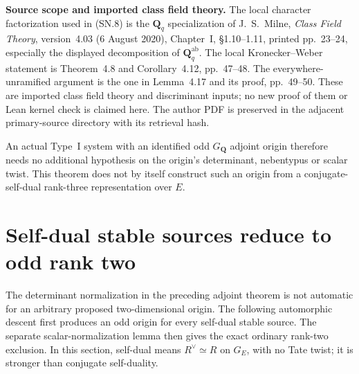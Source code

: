 \documentclass[11pt,a4paper]{article}
\theoremstyle{definition}
\renewcommand{\paragraph}[1]{\par\smallskip\noindent\textbf{#1}\quad\ignorespaces}
\begin{document}
\paragraph{Source scope and imported class field theory.}
The local character factorization used in (SN.8) is the
$\mathbf Q_q$ specialization of J.~S.~Milne,
\emph{Class Field Theory}, version~4.03 (6 August 2020),
Chapter~I, \S1.10--1.11, printed pp.~23--24, especially
the displayed decomposition of $\mathbf Q_q^{\mathrm{ab}}$.
The local Kronecker--Weber statement is Theorem~4.8 and
Corollary~4.12, pp.~47--48.  The everywhere-unramified argument
is the one in Lemma~4.17 and its proof, pp.~49--50.
These are imported class field theory and discriminant inputs;
no new proof of them or Lean kernel check is claimed here.
The author PDF is preserved in the adjacent primary-source
directory with its retrieval hash.

An actual Type~I system with an identified odd $G_{\mathbf Q}$
adjoint origin therefore needs no additional hypothesis on the
origin's determinant, nebentypus or scalar twist.  This theorem
does not by itself construct such an origin from a
conjugate-self-dual rank-three representation over $E$.



\section{Self-dual stable sources reduce to odd rank two}
\label{sec:kt-selfdual-source-exclusion}

The determinant normalization in the preceding adjoint theorem is
not automatic for an arbitrary proposed two-dimensional origin.
The following automorphic descent first produces an odd origin for
every self-dual stable source.  The separate scalar-normalization
lemma then gives the exact ordinary rank-two exclusion.  In this
section, self-dual means $R^\vee\simeq R$ on $G_E$, with no Tate
twist; it is stronger than conjugate self-duality.
\end{document}
